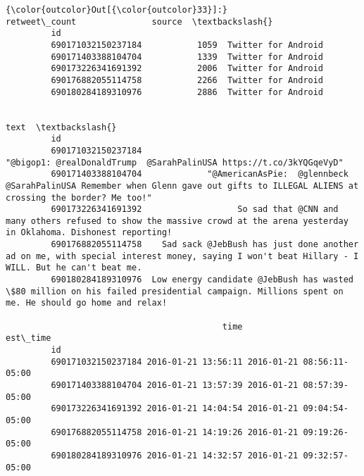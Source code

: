 \documentclass[11pt]{article}
\begin{document}
\begin{Verbatim}[commandchars=\\\{\}]
{\color{outcolor}Out[{\color{outcolor}33}]:}                     retweet\_count               source  \textbackslash{}
         id                                                       
         690171032150237184           1059  Twitter for Android   
         690171403388104704           1339  Twitter for Android   
         690173226341691392           2006  Twitter for Android   
         690176882055114758           2266  Twitter for Android   
         690180284189310976           2886  Twitter for Android   
         
                                                                                                                                                                     text  \textbackslash{}
         id                                                                                                                                                                 
         690171032150237184                                                                           "@bigop1: @realDonaldTrump  @SarahPalinUSA https://t.co/3kYQGqeVyD"   
         690171403388104704             "@AmericanAsPie:  @glennbeck @SarahPalinUSA Remember when Glenn gave out gifts to ILLEGAL ALIENS at crossing the border? Me too!"   
         690173226341691392                   So sad that @CNN and many others refused to show the massive crowd at the arena yesterday in Oklahoma. Dishonest reporting!   
         690176882055114758    Sad sack @JebBush has just done another ad on me, with special interest money, saying I won't beat Hillary - I WILL. But he can't beat me.   
         690180284189310976  Low energy candidate @JebBush has wasted \$80 million on his failed presidential campaign. Millions spent on me. He should go home and relax!   
         
                                           time                  est\_time  
         id                                                                
         690171032150237184 2016-01-21 13:56:11 2016-01-21 08:56:11-05:00  
         690171403388104704 2016-01-21 13:57:39 2016-01-21 08:57:39-05:00  
         690173226341691392 2016-01-21 14:04:54 2016-01-21 09:04:54-05:00  
         690176882055114758 2016-01-21 14:19:26 2016-01-21 09:19:26-05:00  
         690180284189310976 2016-01-21 14:32:57 2016-01-21 09:32:57-05:00  
\end{Verbatim}
            
\end{document}
